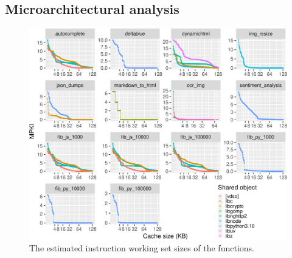 \subsection{Microarchitectural analysis}
\label{subsec:topdown}

\begin{figure}
  \centering
  \includegraphics[width=\textwidth]{figures/simulated_miss_rates.pdf}
  \caption{\label{fig:code-footprint} The estimated instruction working set sizes of the functions.}
\end{figure}


